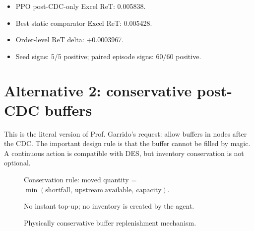 \documentclass[11pt]{article}
\begin{document}
\begin{itemize}[leftmargin=1.5em]
  \item PPO post-CDC-only Excel ReT: 0.005838.
  \item Best static comparator Excel ReT: 0.005428.
  \item Order-level ReT delta: +0.0003967.
  \item Seed signs: 5/5 positive; paired episode signs: 60/60 positive.
\end{itemize}

\section*{Alternative 2: conservative post-CDC buffers}

This is the literal version of Prof. Garrido's request: allow buffers in nodes
after the CDC. The important design rule is that the buffer cannot be filled by
magic. A continuous action is compatible with DES, but inventory conservation is
not optional.

\begin{figure}[ht]
  \centering
  \scriptsize
  \setlength{\fboxsep}{3pt}

  \vspace{0.5em}
  \textcolor{green!45!black}{Conservation rule: moved quantity =
  $\min(\mathrm{shortfall},\ \mathrm{upstream\ available},\ \mathrm{capacity})$.}

  \textcolor{green!45!black}{No instant top-up; no inventory is created by the agent.}
  \caption{Physically conservative buffer replenishment mechanism.}
\end{figure}
\end{document}
